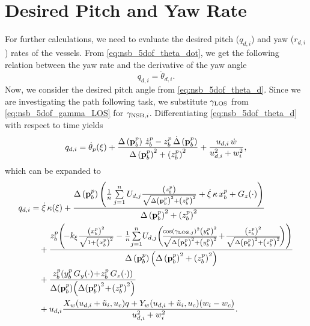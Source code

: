 \section{Desired Pitch and Yaw Rate}
For further calculations, we need to evaluate the desired pitch ($q_{d,i}$) and yaw ($r_{d,i}$) rates of the vessels.
From \eqref{eq:nsb_5dof_theta_dot}, we get the following relation between the yaw rate and the derivative of the yaw angle
\begin{equation}
    q_{d,i} = \dot{\theta}_{d,i}.
\end{equation}
Now, we consider the desired pitch angle from \eqref{eq:nsb_5dof_theta_d}.
Since we are investigating the path following task, we substitute $\gamma_{\rm LOS}$ from \eqref{eq:nsb_5dof_gamma_LOS} for $\gamma_{{\rm NSB}, i}$.
Differentiating \eqref{eq:nsb_5dof_theta_d} with respect to time yields
\begin{equation}
    q_{d,i} = \dot{\theta}_p(\xi) + \frac{\Delta\left(\mathbf{p}_b^p\right)\,\dot{z}_b^p - z_b^p\,\dot{\Delta}\left(\mathbf{p}_b^p\right)}{\Delta\left(\mathbf{p}_b^p\right)^2 + \left(z_b^p\right)^2} + \frac{u_{d,i}\,\dot{w}}{u_{d,i}^2 + w_i^2},
\end{equation}
which can be expanded to
\begin{equation}
    \begin{split}
        q_{d,i} &= \dot{\xi}\,\kappa(\xi) + \frac{\Delta\left(\mat{p}_b^p\right)\left(\frac{1}{n} \sum\limits_{j=1}^n U_{d,j}\frac{\left(z_b^p\right)}{\sqrt{\Delta\left(\mat{p}_b^p\right)^2 + \left(z_b^p\right)^2}} + \dot{\xi}\,\kappa\,x_b^p + G_z(\cdot)\right)}{\Delta\left(\mat{p}_b^p\right)^2 + \left(z_b^p\right)^2} \\
        &\quad + \frac{z_b^p\!\left(\!-k_{\xi}\frac{\left(x_b^p\right)^2}{\sqrt{1+\left(x_b^p\right)^2}} - \frac{1}{n}\!\sum\limits_{j=1}^n \!U_{d,j}\!\left(\!\scale[1]{\frac{\cos\left(\gamma_{{\rm LOS},j}\right)^2\left(y_b^p\right)^2}{\sqrt{\Delta\left(\mat{p}_b^p\right)^2 + \left(y_b^p\right)^2}}}\! + \!\frac{\left(z_b^p\right)^2}{\sqrt{\Delta\left(\mat{p}_b^p\right)^2 + \left(z_b^p\right)^2}}\!\right)\right)}{\Delta\left(\mat{p}_b^p\right)\left(\Delta\left(\mat{p}_b^p\right)^2 + \left(z_b^p\right)^2\right)} \\
        &\quad + \frac{z_b^p\!\left(y_b^p\,G_y(\cdot) \!+\! z_b^p\,G_z(\cdot)\right)}{\Delta\!\left(\mat{p}_b^p\right)\!\left(\Delta\!\left(\mat{p}_b^p\right)^2 \!+\! \left(z_b^p\right)^2\right)} \\
        & \quad + u_{d,i}\frac{X_w\!\left(u_{d,i}+\tilde{u}_i, u_c\right)\!q + Y_w\!\left(u_{d,i}+\tilde{u}_i, u_c\right)\!\left(w_i - w_c\right)}{u_{d,i}^2 + w_i^2}.
    \end{split}
    \label{eq:nsb_5dof_q_d}
\end{equation}


